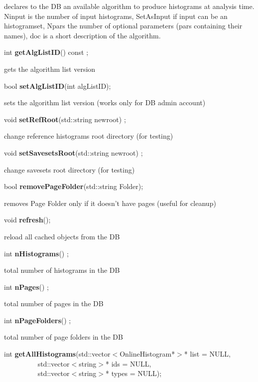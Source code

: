  declares to the DB an available algorithm to produce histograms at
 analysis time. Ninput is the number of input histograms, SetAsInput
 if input can be an histogramset, Npars the
 number of optional parameters (pars containing their names), doc is a short
 description of the algorithm.


\item    int {\bf getAlgListID}() const ;

 gets the algorithm list version


\item    bool {\bf setAlgListID}(int algListID);


 sets the algorithm list version (works only for DB admin account)


\item    void {\bf setRefRoot}(std::string newroot) ;

 change reference histograms root directory (for testing)


\item    void {\bf setSavesetsRoot}(std::string newroot) ;

 change savesets root directory (for testing)


\item    bool {\bf removePageFolder}(std::string Folder);


 removes Page Folder only if it doesn't have pages (useful for cleanup)


\item    void {\bf refresh}();


 reload all cached objects from the DB


\item    int {\bf nHistograms}() ;

 total number of histograms in the DB


\item    int {\bf nPages}() ;

 total number of pages in the DB


\item    int {\bf nPageFolders}() ;

  total number of page folders in the DB


\item    int {\bf getAllHistograms}(std::vector$<$OnlineHistogram*$>$* list = NULL,\\\mbox{}~~~~~~~~~
		       std::vector$<$string$>$* ids = NULL,\\\mbox{}~~~~~~~~~
		       std::vector$<$string$>$* types = NULL);

